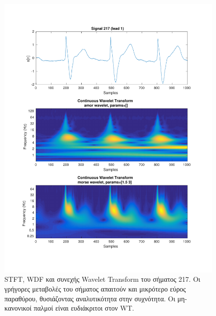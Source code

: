\documentclass[11pt,a4paper]{article}
\begin{document}
\begin{figure}[H]
\begin{minipage}{0.48\textwidth}
	\includegraphics[width=\textwidth]{fig/217l1_cwt.pdf}
\end{minipage}
\vfill
\caption{STFT, WDF και συνεχής Wavelet Transform του σήματος 217. Οι γρήγορες μεταβολές του σήματος απαιτούν και μικρότερο εύρος παραθύρου, θυσιάζοντας αναλυτικότητα στην συχνότητα. Οι μη-κανονικοί παλμοί είναι ευδιάκριτοι στον WT.}
\label{fig:217l1_stft_wdf_wt}
\end{figure}
\end{document}
